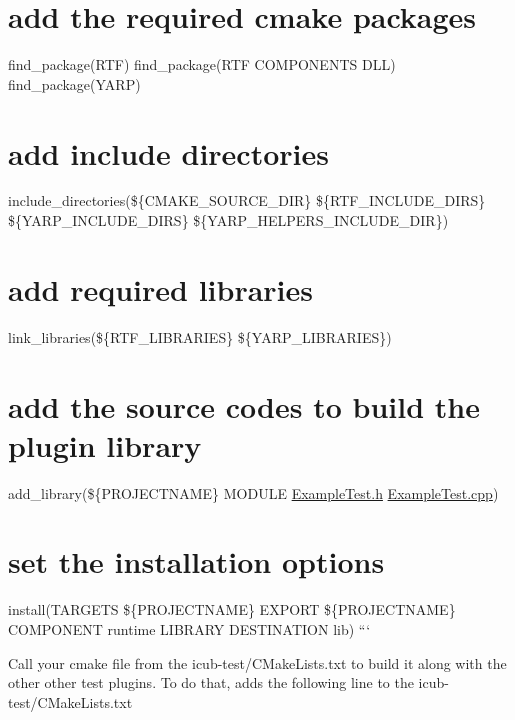 \section*{add the required cmake packages}

find\-\_\-package(\-R\-T\-F) find\-\_\-package(\-R\-T\-F C\-O\-M\-P\-O\-N\-E\-N\-T\-S D\-L\-L) find\-\_\-package(\-Y\-A\-R\-P)

\section*{add include directories}

include\-\_\-directories(\$\{C\-M\-A\-K\-E\-\_\-\-S\-O\-U\-R\-C\-E\-\_\-\-D\-I\-R\} \$\{R\-T\-F\-\_\-\-I\-N\-C\-L\-U\-D\-E\-\_\-\-D\-I\-R\-S\} \$\{Y\-A\-R\-P\-\_\-\-I\-N\-C\-L\-U\-D\-E\-\_\-\-D\-I\-R\-S\} \$\{Y\-A\-R\-P\-\_\-\-H\-E\-L\-P\-E\-R\-S\-\_\-\-I\-N\-C\-L\-U\-D\-E\-\_\-\-D\-I\-R\})

\section*{add required libraries}

link\-\_\-libraries(\$\{R\-T\-F\-\_\-\-L\-I\-B\-R\-A\-R\-I\-E\-S\} \$\{Y\-A\-R\-P\-\_\-\-L\-I\-B\-R\-A\-R\-I\-E\-S\})

\section*{add the source codes to build the plugin library}

add\-\_\-library(\$\{P\-R\-O\-J\-E\-C\-T\-N\-A\-M\-E\} M\-O\-D\-U\-L\-E \hyperlink{ExampleTest_8h_source}{Example\-Test.\-h} \hyperlink{ExampleTest_8cpp_source}{Example\-Test.\-cpp})

\section*{set the installation options}

install(T\-A\-R\-G\-E\-T\-S \$\{P\-R\-O\-J\-E\-C\-T\-N\-A\-M\-E\} E\-X\-P\-O\-R\-T \$\{P\-R\-O\-J\-E\-C\-T\-N\-A\-M\-E\} C\-O\-M\-P\-O\-N\-E\-N\-T runtime L\-I\-B\-R\-A\-R\-Y D\-E\-S\-T\-I\-N\-A\-T\-I\-O\-N lib) ```

Call your cmake file from the {\ttfamily icub-\/test/\-C\-Make\-Lists.\-txt} to build it along with the other other test plugins. To do that, adds the following line to the {\ttfamily icub-\/test/\-C\-Make\-Lists.\-txt}

